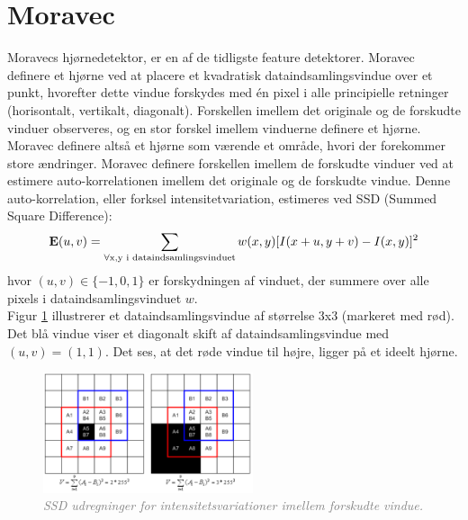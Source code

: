 \section{Moravec}\label{sec:moravec}
Moravecs hjørnedetektor\cite{moravec}, er en af de tidligste feature detektorer. Moravec definere et hjørne ved at placere et kvadratisk dataindsamlingsvindue over et punkt, hvorefter dette vindue forskydes med én pixel i alle principielle retninger (horisontalt, vertikalt, diagonalt). Forskellen imellem det originale og de forskudte vinduer observeres, og en stor forskel imellem vinduerne definere et hjørne. Moravec definere altså et hjørne som værende et område, hvori der forekommer store ændringer. Moravec definere forskellen imellem de forskudte vinduer ved at estimere auto-korrelationen imellem det originale og de forskudte vindue. Denne auto-korrelation, eller forksel intensitetvariation, estimeres ved SSD (Summed Square Difference):
\begin{equation}
\bold{E}(u,v)= \sum_{\forall \text{x,y i dataindsamlingsvinduet}} w(x,y)[I(x+u,y+v) - I(x,y)]^2
\label{moravec}     
\end{equation}
hvor $(u,v)\in \lbrace -1,0,1 \rbrace$ er forskydningen af vinduet, der summere over alle pixels i dataindsamlingsvinduet $w$. 
\\
Figur \ref{fig:moravec} illustrerer et dataindsamlingsvindue af størrelse 3x3 (markeret med rød). Det blå vindue viser et diagonalt skift af dataindsamlingsvindue med $(u,v)=(1,1)$. Det ses, at det røde vindue til højre, ligger på et ideelt hjørne. 
\begin{figure}[H]
    \centering
    \includegraphics[width=0.55\textwidth]{fig/25.png}
     \vspace{-1em}
    \begin{center}    
       \caption{\textcolor{gray}{\footnotesize \textit{ SSD udregninger for intensitetsvariationer imellem forskudte vindue. }}}
    \label{fig:moravec}
     \end{center}
     \vspace{-2.5em}
  \end{figure} \noindent   
